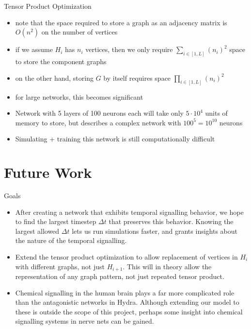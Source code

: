 \documentclass[leqno,presentation,unknownkeysallowed]{beamer}
\begin{document}
\begin{frame}{Tensor Product Optimization}
\begin{itemize}
    \item note that the space required to store a graph as an adjacency matrix is $O(n^2)$ on the number of vertices
    \item if we assume $H_i$ has $n_i$ vertices, then we only require $ \sum_{i \in [1,L]} (n_i)^2 $ space to store the component graphs
    \item on the other hand, storing $G$ by itself requires space $ \prod_{i \in [1,L]} (n_i)^2 $
    \item for large networks, this becomes significant
    \item Network with 5 layers of 100 neurons each will take only $5 \cdot 10^4$ units of memory to store, but describes a complex network with $100^{5}=10^{10}$ neurons
    \item Simulating + training this network is still computationally difficult
\end{itemize}
\end{frame}

\section{Future Work}

\begin{frame}{Goals}
\begin{itemize}
    \item After creating a network that exhibits temporal signalling behavior, we hope to find the largest timestep $\Delta t$ that preserves this behavior. Knowing the largest allowed $\Delta t$ lets us run simulations faster, and grants insights about the nature of the temporal signalling.
    \item Extend the tensor product optimization to allow replacement of vertices in $H_i$ with different graphs, not just $H_{i+1}$. This will in theory allow the representation of any graph pattern, not just repeated tensor product.
    \item Chemical signalling in the human brain plays a far more complicated role than the antagonistic networks in Hydra. Although extending our model to these is outside the scope of this project, perhaps some insight into chemical signalling systems in nerve nets can be gained.
\end{itemize}
\end{frame}
\end{document}
